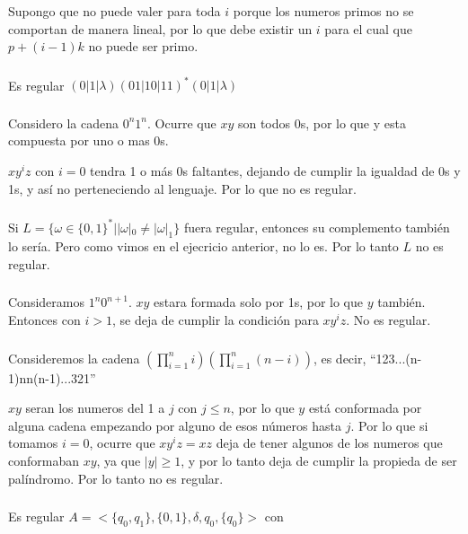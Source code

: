 Supongo que no puede valer para toda $i$ porque los numeros primos no se comportan de manera lineal, por lo que debe existir un $i$ para el cual que $p + (i - 1)k$ no puede ser primo.

\subsubsection{}
Es regular $(0|1|\lambda)(01|10|11)^*(0|1|\lambda)$

\subsubsection{}
Considero la cadena $0^n1^n$. Ocurre que $xy$ son todos 0s, por lo que y esta compuesta por uno o mas 0s. 

$xy^iz$ con $i=0$ tendra 1 o más 0s faltantes, dejando de cumplir la igualdad de 0s y 1s, y así no perteneciendo al lenguaje. Por lo que no es regular.

\subsubsection{}
Si $L = \{\omega \in \{0,1\}^* | |\omega|_0 \neq |\omega|_1\}$ fuera regular, entonces su complemento también lo sería. Pero como vimos en el ejecricio anterior, no lo es. Por lo tanto $L$ no es regular.

\subsubsection{}
Consideramos $1^n0^{n+1}$. $xy$ estara formada solo por 1s, por lo que $y$ también. Entonces con $i > 1$, se deja de cumplir la condición para $xy^iz$. No es regular.

\subsubsection{}
Consideremos la cadena $(\prod_{i = 1}^n i)(\prod_{i = 1}^n (n - i))$, es decir, ``123...(n-1)nn(n-1)...321''

$xy$ seran los numeros del 1 a $j$ con $j \leq n$, por lo que $y$ está conformada por alguna cadena empezando por alguno de esos números hasta $j$. Por lo que si tomamos $i = 0$, ocurre que $xy^iz = xz$ deja de tener algunos de los numeros que conformaban $xy$, ya que $|y| \geq 1$, y por lo tanto deja de cumplir la propieda de ser palíndromo. Por lo tanto no es regular.

\subsubsection{}
Es regular $A = <\{q_0,q_1\}, \{0,1\}, \delta, q_0, \{q_0\}>$ con


